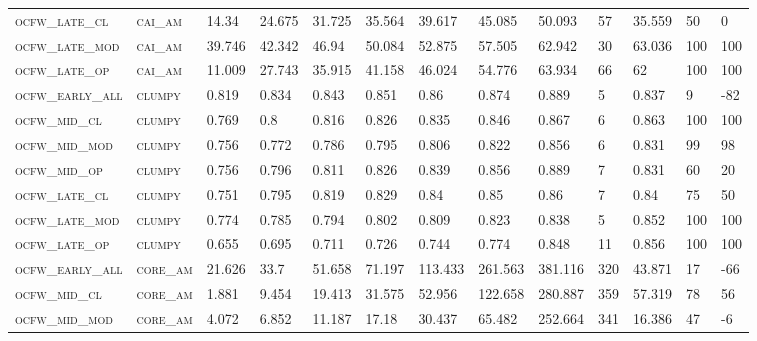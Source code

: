 \begin{landscape}
\begin{center}
\begin{footnotesize}
\begin{longtable}{lllllllllllll}
\textsc{ocfw\_late\_cl  } & \textsc{cai\_am   }   & 14.34    & 24.675   & 31.725   & 35.564   & 39.617   & 45.085   & 50.093   & 57  & 35.559   & 50  & 0    \\
\textsc{ocfw\_late\_mod } & \textsc{cai\_am   }   & 39.746   & 42.342   & 46.94    & 50.084   & 52.875   & 57.505   & 62.942   & 30  & 63.036   & 100 & 100  \\
\textsc{ocfw\_late\_op  } & \textsc{cai\_am   }   & 11.009   & 27.743   & 35.915   & 41.158   & 46.024   & 54.776   & 63.934   & 66  & 62       & 100 & 100  \\
\textsc{ocfw\_early\_all} & \textsc{clumpy    }   & 0.819    & 0.834    & 0.843    & 0.851    & 0.86     & 0.874    & 0.889    & 5   & 0.837    & 9   & -82  \\
\textsc{ocfw\_mid\_cl   } & \textsc{clumpy    }   & 0.769    & 0.8      & 0.816    & 0.826    & 0.835    & 0.846    & 0.867    & 6   & 0.863    & 100 & 100  \\
\textsc{ocfw\_mid\_mod  } & \textsc{clumpy    }   & 0.756    & 0.772    & 0.786    & 0.795    & 0.806    & 0.822    & 0.856    & 6   & 0.831    & 99  & 98   \\
\textsc{ocfw\_mid\_op   } & \textsc{clumpy    }   & 0.756    & 0.796    & 0.811    & 0.826    & 0.839    & 0.856    & 0.889    & 7   & 0.831    & 60  & 20   \\
\textsc{ocfw\_late\_cl  } & \textsc{clumpy    }   & 0.751    & 0.795    & 0.819    & 0.829    & 0.84     & 0.85     & 0.86     & 7   & 0.84     & 75  & 50   \\
\textsc{ocfw\_late\_mod } & \textsc{clumpy    }   & 0.774    & 0.785    & 0.794    & 0.802    & 0.809    & 0.823    & 0.838    & 5   & 0.852    & 100 & 100  \\
\textsc{ocfw\_late\_op  } & \textsc{clumpy    }   & 0.655    & 0.695    & 0.711    & 0.726    & 0.744    & 0.774    & 0.848    & 11  & 0.856    & 100 & 100  \\
\textsc{ocfw\_early\_all} & \textsc{core\_am  }   & 21.626   & 33.7     & 51.658   & 71.197   & 113.433  & 261.563  & 381.116  & 320 & 43.871   & 17  & -66  \\
\textsc{ocfw\_mid\_cl   } & \textsc{core\_am  }   & 1.881    & 9.454    & 19.413   & 31.575   & 52.956   & 122.658  & 280.887  & 359 & 57.319   & 78  & 56   \\
\textsc{ocfw\_mid\_mod  } & \textsc{core\_am  }   & 4.072    & 6.852    & 11.187   & 17.18    & 30.437   & 65.482   & 252.664  & 341 & 16.386   & 47  & -6   \\

\end{longtable}
\end{footnotesize}
\end{center}
\end{landscape}
